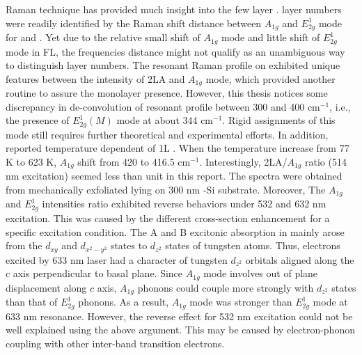 Raman technique has provided much insight into the few layer .  layer numbers were readily identified by the Raman shift distance between $A_{1g}$ and $E_{2g}^1$ mode for \cite{Buscema2013} and .\cite{Berkdemir2013} Yet due to the relative small shift of $A_{1g}$ mode and little shift of $E_{2g}^1$ mode in  FL, the frequencies distance might not qualify as an unambiguous way to distinguish layer numbers. The resonant Raman profile on  exhibited unique features between the intensity of 2LA and $A_{1g}$ mode,\cite{Berkdemir2013,Zhao2013} which provided another routine to assure the monolayer presence. However, this thesis notices some discrepancy in de-convolution of  resonant profile between 300 and 400 cm$^{-1}$, i.e., the presence of $E_{2g}^1(M)$ mode at about 344 cm$^{-1}$.\cite{Peimyoo2013,Cong2013,Berkdemir2013} Rigid assignments of this mode still requires further theoretical\cite{Ataca2012} and experimental efforts. In addition, \citeauthor{M2013} reported temperature dependent of 1L .\cite{M2013} When the temperature increase from 77 K to 623 K, $A_{1g}$ shift from 420 to 416.5 cm$^{-1}$. Interestingly, 2LA/$A_{1g}$ ratio (514 nm excitation) seemed less than unit in this report. The spectra were obtained from mechanically exfoliated  lying on 300 nm -Si substrate. Moreover, The $A_{1g}$ and $E_{2g}^1$ intensities ratio exhibited reverse behaviors under 532 and 632 nm excitation. This was caused by the different cross-section enhancement for a specific excitation condition. The A and B excitonic absorption in  mainly arose from the $d_{xy}$ and $d_{x^2 - y^2}$ states to $d_{z^2}$ states of tungsten atoms. Thus, electrons excited by 633 nm laser had a character of tungsten $d_{z^2}$ orbitals aligned along the $c$ axis perpendicular to  basal plane. Since $A_{1g}$ mode involves out of plane displacement along $c$ axis, $A_{1g}$ phonons could couple more strongly with $d_{z^2}$ states than that of $E_{2g}^1$ phonons. As a result, $A_{1g}$ mode was stronger than $E_{2g}^1$ mode at 633 nm resonance.\cite{Zhao2013} However, the reverse effect for 532 nm excitation could not be well explained using the above argument. This may be caused by electron-phonon coupling with other inter-band transition electrons.

